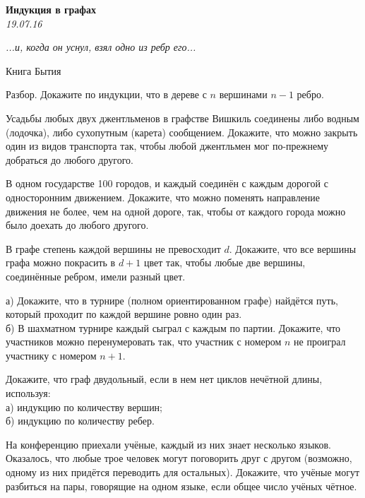\begin{center}
\textbf{\Large Индукция в графах}\\
\textit{19.07.16}
\end{center}

\epigraph{\it ...и, когда он уснул, взял одно из ребр его...}{Книга Бытия}

Разбор. Докажите по индукции, что в дереве с $n$ вершинами $n-1$ ребро.

\begin{problems}

\item
Усадьбы любых двух джентльменов в графстве Вишкиль соединены либо водным (лодочка), либо сухопутным (карета) сообщением. Докажите, что можно закрыть один из видов транспорта так, чтобы любой джентльмен мог по-прежнему добраться до любого другого.

\item В одном государстве 100 городов, и каждый соединён с каждым дорогой с односторонним движением. Докажите, что можно поменять направление движения не более, чем на одной дороге, так, чтобы от каждого города можно было доехать до любого другого.

\item В графе степень каждой вершины не превосходит $d$. Докажите, что все вершины графа можно покрасить в $d + 1$ цвет так, чтобы любые две вершины, соединённые ребром, имели разный цвет. 

\item  а) Докажите, что в турнире (полном ориентированном графе) найдётся путь, который проходит по каждой вершине ровно один раз. \\
б) В шахматном турнире каждый сыграл с каждым по партии. Докажите, что участников можно перенумеровать так, что участник с номером $n$ не проиграл участнику с номером $n+1$.

\item Докажите, что граф двудольный, если в нем нет циклов нечётной длины, используя:\\
а) индукцию по количеству вершин;\\
б) индукцию по количеству ребер.


\item На конференцию приехали учёные, каждый из них знает несколько языков. Оказалось, что любые трое человек могут поговорить друг с другом (возможно, одному из них придётся переводить для остальных). Докажите, что учёные могут разбиться на пары, говорящие на одном языке, если общее число учёных чётное.


\end{problems}
